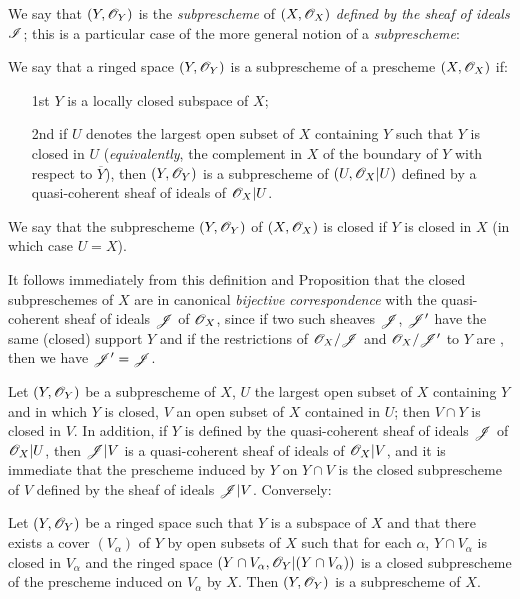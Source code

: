 We say that $(Y,\mathscr{O}_Y)$ is the \emph{subprescheme} of $(X,\mathscr{O}_X)$ \emph{defined by the sheaf of ideals $\mathscr{I}$}; this is a particular case of the more general notion of a \emph{subprescheme}:

\begin{defn}[4.1.3]
\label{1.4.1.3}
We say that a ringed space $(Y,\mathscr{O}_Y)$ is a subprescheme of a prescheme $(X,\mathscr{O}_X)$ if:
\begin{enumerate}
  \item[1st] $Y$ is a locally closed subspace of $X$;
  \item[2nd] if $U$ denotes the largest open subset of $X$ containing $Y$ such that $Y$ is closed in $U$ (\emph{equivalently}, the complement in $X$ of the boundary of $Y$ with respect to $\overline{Y}$), then $(Y,\mathscr{O}_Y)$ is a subprescheme of $(U,\mathscr{O}_X|U)$ defined by a quasi-coherent sheaf of ideals of $\mathscr{O}_X|U$.
\end{enumerate}
We say that the subprescheme $(Y,\mathscr{O}_Y)$ of $(X,\mathscr{O}_X)$ is closed if $Y$ is closed in $X$ (in which case $U=X$).
\end{defn}

It follows immediately from this definition and Proposition  that the closed subpreschemes of $X$ are in canonical \emph{bijective correspondence} with the quasi-coherent sheaf of ideals $\mathscr{J}$ of $\mathscr{O}_X$, since if two such sheaves $\mathscr{J}$, $\mathscr{J}'$ have the same (closed) support $Y$ and if the restrictions of $\mathscr{O}_X/\mathscr{J}$ and $\mathscr{O}_X/\mathscr{J}'$ to $Y$ are , then we have $\mathscr{J}'=\mathscr{J}$.

\begin{env}[4.1.4]
\label{1.4.1.4}
Let $(Y,\mathscr{O}_Y)$ be a subprescheme of $X$, $U$ the largest open subset of $X$ containing $Y$ and in which $Y$ is closed, $V$ an open subset of $X$ contained in $U$; then $V\cap Y$ is closed in $V$. In addition, if $Y$ is defined by the quasi-coherent sheaf of ideals $\mathscr{J}$ of $\mathscr{O}_X|U$, then $\mathscr{J}|V$ is a quasi-coherent sheaf of ideals of $\mathscr{O}_X|V$, and it is immediate that the prescheme induced by $Y$ on $Y\cap V$ is the closed subprescheme of $V$ defined by the sheaf of ideals $\mathscr{J}|V$.
Conversely:
\end{env}

\begin{prop}[4.1.5]
\label{1.4.1.5}
Let $(Y,\mathscr{O}_Y)$ be a ringed space such that $Y$ is a subspace of $X$ and that there exists a cover $(V_\alpha)$ of $Y$ by open subsets of $X$ such that for each $\alpha$, $Y\cap V_\alpha$ is closed in $V_\alpha$ and the ringed space $(Y\cap V_\alpha,\mathscr{O}_Y|(Y\cap V_\alpha))$ is a closed subprescheme of the prescheme induced on $V_\alpha$ by $X$.
Then $(Y,\mathscr{O}_Y)$ is a subprescheme of $X$.
\end{prop}

